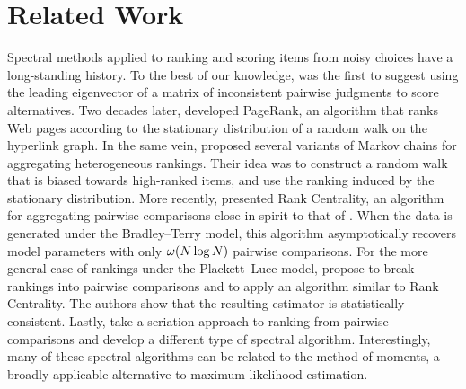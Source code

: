 \section{Related Work}
\label{fi:sec:relwork}

Spectral methods applied to ranking and scoring items from noisy choices have a long-standing history.
To the best of our knowledge, \citet{saaty1980analytic} was the first to suggest using the leading eigenvector of a matrix of inconsistent pairwise judgments to score alternatives.
Two decades later, \citet{page1998pagerank} developed PageRank, an algorithm that ranks Web pages according to the stationary distribution of a random walk on the hyperlink graph.
In the same vein, \citet{dwork2001rank} proposed several variants of Markov chains for aggregating heterogeneous rankings.
Their idea was to construct a random walk that is biased towards high-ranked items, and use the ranking induced by the stationary distribution.
More recently, \citet{negahban2012iterative} presented Rank Centrality, an algorithm for aggregating pairwise comparisons close in spirit to that of \citet{dwork2001rank}.
When the data is generated under the Bradley--Terry model, this algorithm asymptotically recovers model parameters with only $\omega(N \log N)$ pairwise comparisons.
For the more general case of rankings under the Plackett--Luce model, \citet{azari2013generalized} propose to break rankings into pairwise comparisons and to apply an algorithm similar to Rank Centrality.
The authors show that the resulting estimator is statistically consistent.
Lastly, \citet{fogel2014serialrank} take a seriation approach to ranking from pairwise comparisons and develop a different type of spectral algorithm.
Interestingly, many of these spectral algorithms can be related to the method of moments, a broadly applicable alternative to maximum-likelihood estimation.


